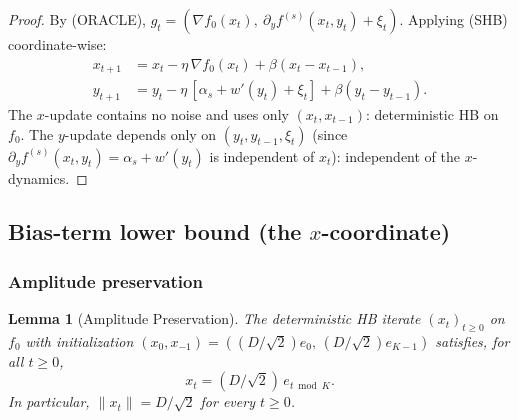 \documentclass[11pt]{article}
\newtheorem{lemma}[theorem]{Lemma}
\theoremstyle{definition}
\theoremstyle{remark}
\begin{document}
\begin{proof}
By (ORACLE), $g_t = (\nabla f_0(x_t),\ \partial_y f^{(s)}(x_t, y_t) + \xi_t)$. Applying (SHB) coordinate-wise:
\begin{align*}
x_{t+1} &= x_t - \eta\,\nabla f_0(x_t) + \beta(x_t - x_{t-1}),\\
y_{t+1} &= y_t - \eta\,[\alpha_s + w'(y_t) + \xi_t] + \beta(y_t - y_{t-1}).
\end{align*}
The $x$-update contains no noise and uses only $(x_t, x_{t-1})$: deterministic HB on $f_0$. The $y$-update depends only on $(y_t, y_{t-1}, \xi_t)$ (since $\partial_y f^{(s)}(x_t, y_t) = \alpha_s + w'(y_t)$ is independent of $x_t$): independent of the $x$-dynamics.
\end{proof}

\subsection{Bias-term lower bound (the \texorpdfstring{$x$}{x}-coordinate)}

\subsubsection{Amplitude preservation}

\begin{lemma}[Amplitude Preservation]
\label{lem:amplitude}
The deterministic HB iterate $(x_t)_{t \geq 0}$ on $f_0$ with initialization $(x_0, x_{-1}) = ((D/\sqrt 2) e_0,\, (D/\sqrt 2) e_{K-1})$ satisfies, for all $t \geq 0$,
\[
  x_t = (D/\sqrt 2)\, e_{t \bmod K}.
\]
In particular, $\|x_t\| = D/\sqrt 2$ for every $t \geq 0$.
\end{lemma}
\end{document}
